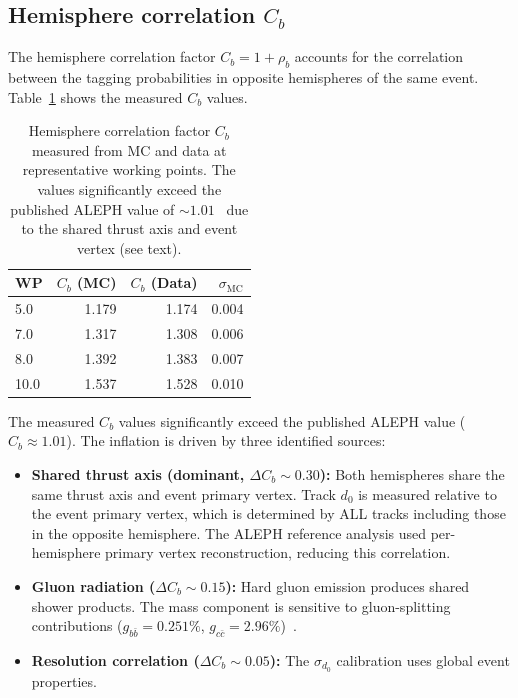 \documentclass[11pt,a4paper]{article}
\begin{document}
\subsection{Hemisphere correlation $C_b$}
\label{sec:hemisphere_corr}

The hemisphere correlation factor $C_b = 1 + \rho_b$ accounts for the
correlation between the tagging probabilities in opposite hemispheres of the same
event. Table~\ref{tab:cb_values} shows the measured $C_b$ values.

\begin{table}[htbp]
\centering
\caption{Hemisphere correlation factor $C_b$ measured from MC and data at
representative working points. The values significantly exceed the published
ALEPH value of $\sim 1.01$~\cite{ALEPH:Rb:1996} due to the shared thrust axis
and event vertex (see text).}
\label{tab:cb_values}
\begin{tabular}{lrrr}
\toprule
WP & $C_b$ (MC) & $C_b$ (Data) & $\sigma_\mathrm{MC}$ \\
\midrule
5.0 & 1.179 & 1.174 & 0.004 \\
7.0 & 1.317 & 1.308 & 0.006 \\
8.0 & 1.392 & 1.383 & 0.007 \\
10.0 & 1.537 & 1.528 & 0.010 \\
\bottomrule
\end{tabular}
\end{table}

The measured $C_b$ values significantly exceed the published ALEPH value ($C_b \approx 1.01$).
The inflation is driven by three identified sources:
\begin{itemize}
\item \textbf{Shared thrust axis (dominant, $\Delta C_b \sim 0.30$):} Both hemispheres share the same
thrust axis and event primary vertex. Track $d_0$ is measured relative to the event
primary vertex, which is determined by ALL tracks including those in the opposite
hemisphere. The ALEPH reference analysis used per-hemisphere primary vertex
reconstruction, reducing this correlation.
\item \textbf{Gluon radiation ($\Delta C_b \sim 0.15$):} Hard gluon emission produces shared
shower products. The mass component is sensitive to gluon-splitting contributions
($g_{b\bar{b}} = 0.251\%$, $g_{c\bar{c}} = 2.96\%$)~\cite{LEP:HF:2001, LEP:gcc}.
\item \textbf{Resolution correlation ($\Delta C_b \sim 0.05$):} The $\sigma_{d_0}$ calibration
uses global event properties.
\end{itemize}
\end{document}

